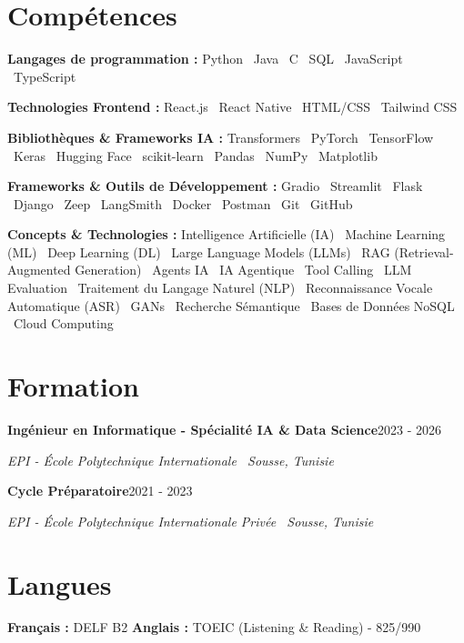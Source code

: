 \documentclass[11pt,a4paper]{article}
\newcommand{\entry}[2]{\textbf{#1}\hfill{\small\color{muted}#2}\par}
\newcommand{\org}[1]{{\itshape\color{muted}#1}\par}
\begin{document}
\section{Compétences}
\textbf{\color{accent}Langages de programmation :} Python \textperiodcentered\ Java \textperiodcentered\ C \textperiodcentered\ SQL \textperiodcentered\ JavaScript \textperiodcentered\ TypeScript\par
\vspace{1.5pt}
\textbf{\color{accent}Technologies Frontend :} React.js \textperiodcentered\ React Native \textperiodcentered\ HTML/CSS \textperiodcentered\ Tailwind CSS\par
\vspace{1.5pt}
\textbf{\color{accent}Bibliothèques \& Frameworks IA :} Transformers \textperiodcentered\ PyTorch \textperiodcentered\ TensorFlow \textperiodcentered\ Keras \textperiodcentered\ Hugging Face \textperiodcentered\ scikit-learn \textperiodcentered\ Pandas \textperiodcentered\ NumPy \textperiodcentered\ Matplotlib\par
\vspace{1.5pt}
\textbf{\color{accent}Frameworks \& Outils de Développement :} Gradio \textperiodcentered\ Streamlit \textperiodcentered\ Flask \textperiodcentered\ Django \textperiodcentered\ Zeep \textperiodcentered\ LangSmith \textperiodcentered\ Docker \textperiodcentered\ Postman \textperiodcentered\ Git \textperiodcentered\ GitHub\par
\vspace{1.5pt}
\textbf{\color{accent}Concepts \& Technologies :} Intelligence Artificielle (IA) \textperiodcentered\ Machine Learning (ML) \textperiodcentered\ Deep Learning (DL) \textperiodcentered\ Large Language Models (LLMs) \textperiodcentered\ RAG (Retrieval-Augmented Generation) \textperiodcentered\ Agents IA \textperiodcentered\ IA Agentique \textperiodcentered\ Tool Calling \textperiodcentered\ LLM Evaluation \textperiodcentered\ Traitement du Langage Naturel (NLP) \textperiodcentered\ Reconnaissance Vocale Automatique (ASR) \textperiodcentered\ GANs \textperiodcentered\ Recherche Sémantique \textperiodcentered\ Bases de Données NoSQL \textperiodcentered\ Cloud Computing\par

\section{Formation}
\entry{Ingénieur en Informatique - Spécialité IA \& Data Science}{2023 - 2026}
\org{EPI - École Polytechnique Internationale \textperiodcentered\ Sousse, Tunisie}
\vspace{2pt}

\entry{Cycle Préparatoire}{2021 - 2023}
\org{EPI - École Polytechnique Internationale Privée \textperiodcentered\ Sousse, Tunisie}

\section{Langues}
\textbf{\color{accent}Français :} DELF B2 \qquad
\textbf{\color{accent}Anglais :} TOEIC (Listening \& Reading) - 825/990
\end{document}
